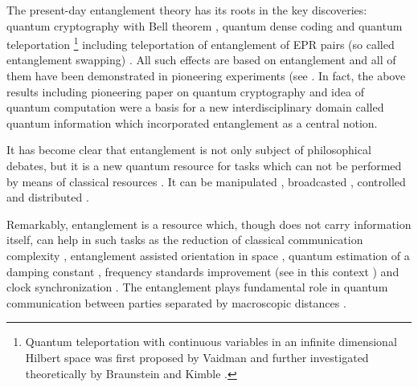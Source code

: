 \documentclass[rmp,12pt,preprint]{revtex4-2}
\begin{document}
The present-day entanglement theory has its roots in the key
discoveries: quantum cryptography with Bell theorem \cite{E91},
quantum dense coding \cite{BennettW} and quantum teleportation
\cite{Teleportation}\footnote{Quantum teleportation with continuous
  variables in an infinite dimensional Hilbert space was first
  proposed by Vaidman \cite{Vaidman} and further investigated
  theoretically by Braunstein and Kimble \cite{BraunsteinKt}.}
including teleportation of entanglement of EPR pairs (so called
entanglement swapping)
\cite{Yurke,YurkeStoller_ent_swapping,ent_swapping,BoseWKt}.  All such
effects are based on entanglement and all of them have been
demonstrated in pioneering experiments (see \cite
{Kimble-teleportation,Rzym-teleportation,Wieden-teleportation,JenSWWZ-exp,NaikPWBK,TittelBZG,MattleWKZ1996,exp_ent_swapping}.
In fact, the above results including pioneering paper on quantum
cryptography \cite{BB84} and idea of quantum computation
\cite{Feynman,DDeutsch,Shor,Steane-codes-prl} were a basis for a new
interdisciplinary domain called quantum information \cite
{Nielsen-Chuang,Alber2001,BouwmeesterEZ-book,BraunsteinP,LoSPbook,DagBook}
which incorporated entanglement as a central notion.

It has become clear that entanglement is not only subject of
philosophical debates, but it is a new quantum resource for tasks
which can not be performed by means of classical resources \cite
{Bennett98}. It can be manipulated \cite
{BBPSSW1996,BDSW1996,Popescu2,Gisin96,RaimondBH}, broadcasted
\cite{Buzek-local-cloning}, controlled and distributed
\cite{CiracZ,MandilaraAKK2007,BeigeBBHKPV2000}.

Remarkably, entanglement is a resource which, though does not carry
information itself, can help in such tasks as the reduction of
classical communication complexity
\cite{CBcom_cplx_1,BuhrmanCD1997-complexity,BruknerZPZ2002-Bell-complexity},
entanglement assisted orientation in space
\cite{BrukerPRV2005-orientation,BovinoGSV2006-orientation-exp}, quantum estimation of a damping constant \cite{VenzlF2007},
frequency standards improvement
\cite{Wineland,GiovannettiLM2004-sci-metrology,HuelgaFreqSt} (see in
this context \cite{BotoLithography}) and clock synchronization
\cite{JozsaADW2000-synchr}. The entanglement plays fundamental role in
quantum communication between parties separated by macroscopic
distances \cite {BDSW1996}.
\end{document}
